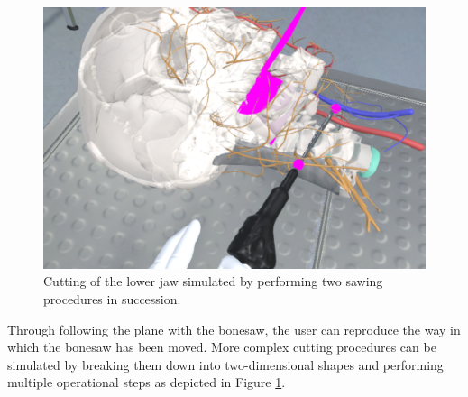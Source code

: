 \begin{figure}[ht]
    \centering
    \includegraphics[width=\linewidth]{images/implementation/features/procedures/bonesaw_2.png}
    \caption{\label{fig::MultipleSawing}Cutting of the lower jaw simulated by performing two sawing procedures in succession.}
\end{figure}

Through following the plane with the bonesaw, the user can reproduce the way in which the bonesaw has been moved.
More complex cutting procedures can be simulated by breaking them down into two-dimensional shapes and performing multiple operational steps as depicted in Figure \ref{fig::MultipleSawing}.